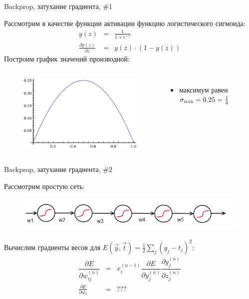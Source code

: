 \documentclass[10pt]{beamer}
\begin{document}
\begin{frame}{Backprop, затухание градиента, \#1}

Рассмотрим в качестве функции активации функцию логистического сигмоида:
\begin{eqnarray*}
y(z) &=& \frac{1}{1 + e^{-z}} \\
\frac{\partial y(z)}{\partial z} &=& y(z)\cdot \left( 1 - y(z) \right)
\end{eqnarray*}
Построим график значений производной:
\begin{columns}
	\begin{figure}[h!]
  		\centering
  		\includegraphics[width=1\textwidth]{images/logsigm_plot.png}
	\end{figure}
    
	\begin{itemize}
		\item максимум равен $\sigma_{\textsc{max}} = 0.25 = \frac{1}{4}$
	\end{itemize}	
\end{columns}

\end{frame}


\begin{frame}{Backprop, затухание градиента, \#2}

Рассмотрим простую сеть:
\begin{figure}[h!]
	\centering
  	\includegraphics[width=1\textwidth]{images/simple_net.png}
\end{figure}
Вычислим градиенты весов для $E(\vec y, \vec t) = \frac{1}{2} \sum_j(y_j - t_j)^2$:
\begin{eqnarray*}
\dfrac{\partial E}{\partial w^{(n)}_{ij}} &=& x_i^{(n - 1)} \dfrac{\partial E}{\partial y^{(n)}_j} \dfrac{\partial y^{(n)}_j}{\partial z^{(n)}_j} \\
\frac{\partial E}{\partial w_5} &=& ???
\end{eqnarray*}

\end{frame}
\end{document}
